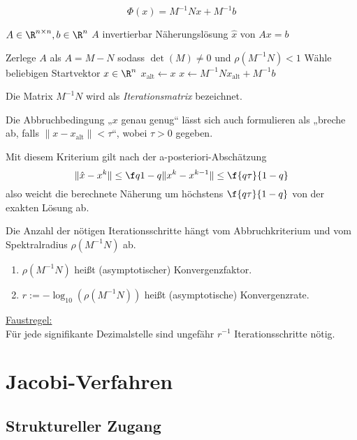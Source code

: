 \documentclass{mycourse}
\begin{document}
\begin{alg}~
	\[
		\Phi(x) = M^{-1}Nx + M^{-1}b
	\]
	\begin{algorithmic}
		\Input $A\in \R^{n\times n}, b\in \R^n$
		\Assume $A$ invertierbar
		\Output Näherungslösung $\hat x$ von $Ax = b$
		\Statex

		\State Zerlege $A$ als $A=M-N$ sodass $\det(M)\neq 0$ und $\rho(M^{-1}N) <1$
		\State Wähle beliebigen Startvektor $x \in \R^n$
			\State $x_{\text{alt}} \gets x$
			\State $x \gets M^{-1}Nx_{\text{alt}} + M^{-1}b$
		\EndWhile
	\end{algorithmic}
\end{alg}
\begin{note}
	Die Matrix $M^{-1}N$ wird als \emph{Iterationsmatrix} bezeichnet.
\end{note}

Die Abbruchbedingung „$x$ genau genug“ lässt sich auch formulieren als
„breche ab, falls $\|x-x_{\text{alt}}\|<\tau$“, wobei $\tau > 0$ gegeben.

Mit diesem Kriterium gilt nach der a-posteriori-Abschätzung
\[
	\|\hat x - x^k\| \le \f q{1-q}\|x^{k}-x^{k-1}\| \le \f {q\tau}{1-q} 
\]
also weicht die berechnete Näherung um höchstens $\f {q\tau}{1-q}$ von der exakten Lösung ab.

Die Anzahl der nötigen Iterationsschritte hängt vom Abbruchkriterium und vom Spektralradius $\rho(M^{-1}N)$ ab.

\begin{df}
	\label{df:4.7}
	\begin{enumerate}[1.]
		\item
			$\rho(M^{-1}N)$ heißt (asymptotischer) Konvergenzfaktor.
		\item
			$r := -\log_{10}(\rho(M^{-1}N))$ heißt (asymptotische) Konvergenzrate.
	\end{enumerate}
\end{df}

\underline{Faustregel:}\\
Für jede signifikante Dezimalstelle sind ungefähr $r^{-1}$ Iterationsschritte nötig.



\setcounter{subsection}{1} %
\section{Jacobi-Verfahren}

\subsection*{Struktureller Zugang}
\end{document}
